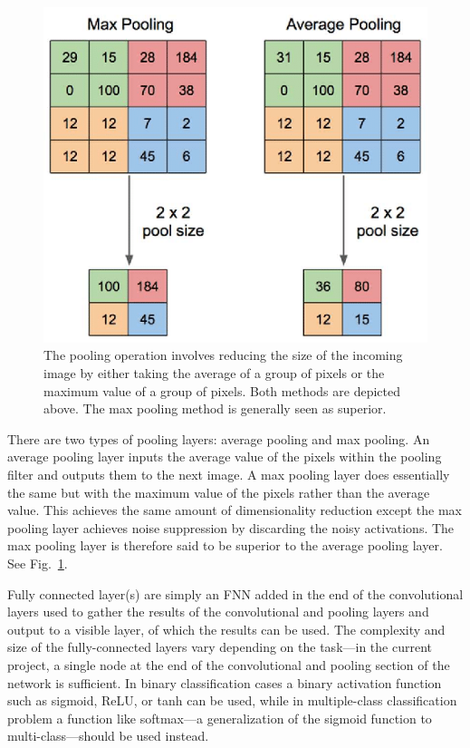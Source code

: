 \documentclass[a4paper,fleqn,usenatbib]{mnras}
\begin{document}
\begin{figure}
\includegraphics[width=\columnwidth]{../Figures/pooling}
\caption{The pooling operation involves reducing the size of the incoming image by either taking the average of a group of pixels or the maximum value of a group of pixels. Both methods are depicted above. The max pooling method is generally seen as superior. \protect\citep{pooling}\label{fig:pooling}}
\end{figure}


There are two types of pooling layers: average pooling and max pooling. An average pooling layer inputs the average value of the pixels within the pooling filter and outputs them to the next image. A max pooling layer does essentially the same but with the maximum value of the pixels rather than the average value. This achieves the same amount of dimensionality reduction except the max pooling layer achieves noise suppression by discarding the noisy activations. The max pooling layer is therefore said to be superior to the average pooling layer. See Fig.~\ref{fig:pooling}. 

Fully connected layer(s) are simply an FNN added in the end of the convolutional layers used to gather the results of the convolutional and pooling layers and output to a visible layer, of which the results can be used. The complexity and size of the fully-connected layers vary depending on the task---in the current project, a single node at the end of the convolutional and pooling section of the network is sufficient. In binary classification cases a binary activation function such as sigmoid, ReLU, or tanh can be used, while in multiple-class classification problem a function like softmax---a generalization of the sigmoid function to multi-class---should be used instead. \citep{Goodfellow-et-al-2016} 
\end{document}
